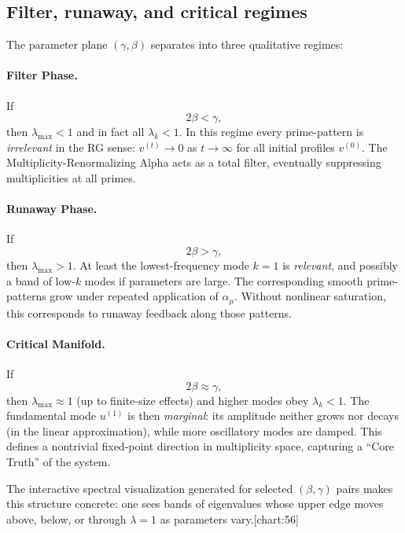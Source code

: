 \documentclass[11pt]{article}
\begin{document}
\subsection{Filter, runaway, and critical regimes}

The parameter plane $(\gamma,\beta)$ separates into three qualitative regimes:

\paragraph{Filter Phase.}
If
\begin{equation}
    2\beta < \gamma,
\end{equation}
then $\lambda_{\max} < 1$ and in fact all $\lambda_k < 1$.
In this regime every prime-pattern is \emph{irrelevant} in the RG sense: $v^{(t)} \to 0$ as $t \to \infty$ for all initial profiles $v^{(0)}$.
The Multiplicity-Renormalizing Alpha acts as a total filter, eventually suppressing multiplicities at all primes.

\paragraph{Runaway Phase.}
If
\begin{equation}
    2\beta > \gamma,
\end{equation}
then $\lambda_{\max} > 1$.
At least the lowest-frequency mode $k=1$ is \emph{relevant}, and possibly a band of low-$k$ modes if parameters are large.
The corresponding smooth prime-patterns grow under repeated application of $\alpha_\mu$.
Without nonlinear saturation, this corresponds to runaway feedback along those patterns.

\paragraph{Critical Manifold.}
If
\begin{equation}
    2\beta \approx \gamma,
\end{equation}
then $\lambda_{\max} \approx 1$ (up to finite-size effects) and higher modes obey $\lambda_k < 1$.
The fundamental mode $u^{(1)}$ is then \emph{marginal}: its amplitude neither grows nor decays (in the linear approximation), while more oscillatory modes are damped.
This defines a nontrivial fixed-point direction in multiplicity space, capturing a ``Core Truth'' of the system.

The interactive spectral visualization generated for selected $(\beta,\gamma)$ pairs makes this structure concrete: one sees bands of eigenvalues whose upper edge moves above, below, or through $\lambda = 1$ as parameters vary.[chart:56]
\end{document}
